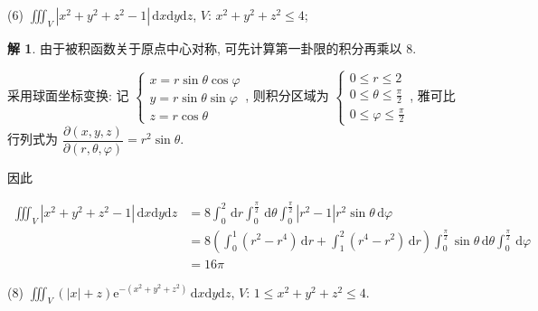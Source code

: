\documentclass[a4paper,12pt]{article}
\theoremstyle{definition}
\newtheorem*{sol}{解}
\begin{document}
(6) $\displaystyle\iiint_V |x^2+y^2+z^2-1| \, \mathrm{d}x\mathrm{d}y\mathrm{d}z$, $V$: $x^2+y^2+z^2 \leq 4$;
\begin{sol}
    由于被积函数关于原点中心对称, 可先计算第一卦限的积分再乘以 $8$.

    采用球面坐标变换: 记 $\begin{cases}
            x=r\sin\theta\cos\varphi \\
            y=r\sin\theta\sin\varphi \\
            z=r\cos\theta
        \end{cases}$, 则积分区域为 $\begin{cases}
            0\leq r\leq 2                  \\
            0\leq \theta\leq \frac{\pi}{2} \\
            0\leq \varphi\leq \frac{\pi}{2}
        \end{cases}$, 雅可比行列式为 $\dfrac{\partial(x,y,z)}{\partial(r,\theta,\varphi)}=r^2\sin\theta$.

    因此

    \begin{align*}
        \iiint_V |x^2+y^2+z^2-1| \, \mathrm{d}x\mathrm{d}y\mathrm{d}z
         & =8\int_0^2\,\mathrm{d}r\int_0^{\frac{\pi}{2}}\,\mathrm{d}\theta\int_0^{\frac{\pi}{2}}\left|r^2-1\right|r^2\sin\theta\,\mathrm{d}\varphi                                   \\
         & =8\left(\int_0^1 (r^2-r^4)\,\mathrm{d}r+\int_1^2 (r^4-r^2)\,\mathrm{d}r\right)\int_0^{\frac{\pi}{2}}\sin\theta\,\mathrm{d}\theta\int_0^{\frac{\pi}{2}}\,\mathrm{d}\varphi \\
         & =16\pi
    \end{align*}
\end{sol}
(8) $\displaystyle\iiint_V (|x|+z) \mathrm{e}^{-(x^2+y^2+z^2)} \, \mathrm{d}x\mathrm{d}y\mathrm{d}z$, $V$: $1 \leq x^2+y^2+z^2 \leq 4$.
\end{document}
